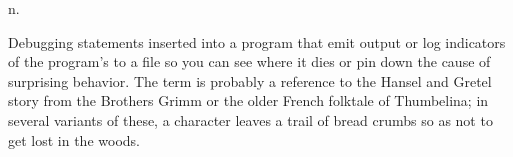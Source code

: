  n.

Debugging statements inserted into a program that emit output or log indicators
of the program's  to a file so you can see where it dies or pin
down the cause of surprising behavior. The term is probably a reference to the
Hansel and Gretel story from the Brothers Grimm or the older French folktale of
Thumbelina; in several variants of these, a character leaves a trail of bread
crumbs so as not to get lost in the woods.

